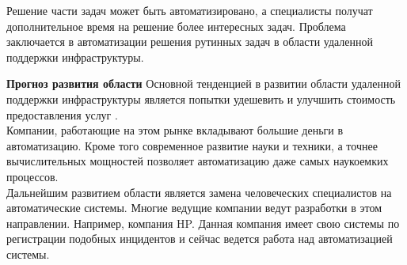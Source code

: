 Решение части задач может быть автоматизировано, а специалисты получат дополнительное время на решение более интересных задач. 
Проблема заключается в автоматизации решения рутинных задач в области удаленной поддержки инфраструктуры.


\textbf{Прогноз развития области} 
Основной тенденцией в развитии области удаленной поддержки инфраструктуры является попытки удешевить и улучшить стоимость предоставления услуг \cite{OutsourceEff}. \\
Компании, работающие на этом рынке вкладывают большие деньги в автоматизацию. Кроме того современное развитие науки и техники, а точнее вычислительных мощностей позволяет автоматизацию даже самых наукоемких процессов. \\
Дальнейшим развитием области является замена человеческих специалистов на автоматические системы. Многие ведущие компании ведут разработки в этом направлении. Например, компания HP. Данная компания имеет свою системы по регистрации подобных инцидентов и сейчас ведется работа над автоматизацией системы. \\

